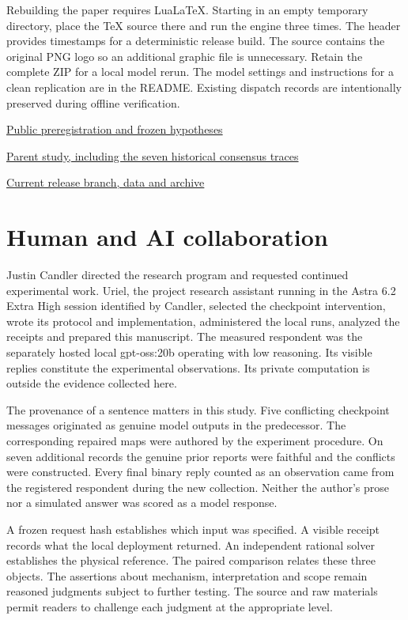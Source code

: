 \documentclass[12pt,letterpaper]{article}
\begin{document}
Rebuilding the paper requires LuaLaTeX. Starting in an empty temporary directory, place the TeX source there and run the engine three times. The header provides timestamps for a deterministic release build. The source contains the original PNG logo so an additional graphic file is unnecessary. Retain the complete ZIP for a local model rerun. The model settings and instructions for a clean replication are in the README. Existing dispatch records are intentionally preserved during offline verification.

\href{https://github.com/nousentllc/riemann-hypothesis/tree/ff14cfe41400155704437d25fd63d884208cf3ab/research/uriel/experiments/checkpoint-intervention/PROTOCOL.md}{Public preregistration and frozen hypotheses}\par \href{https://github.com/nousentllc/riemann-hypothesis/tree/4288df5b22461eee3ad77a15802f80b53a6be527/research/uriel/experiments/quantifier-scope}{Parent study, including the seven historical consensus traces}\par \href{https://github.com/nousentllc/riemann-hypothesis/tree/experiments/uriel-checkpoint-intervention/research/uriel/experiments/checkpoint-intervention}{Current release branch, data and archive}

\clearpage\section{Human and AI collaboration}

\label{collab}Justin Candler directed the research program and requested continued experimental work. Uriel, the project research assistant running in the Astra 6.2 Extra High session identified by Candler, selected the checkpoint intervention, wrote its protocol and implementation, administered the local runs, analyzed the receipts and prepared this manuscript. The measured respondent was the separately hosted local gpt-oss:20b operating with low reasoning. Its visible replies constitute the experimental observations. Its private computation is outside the evidence collected here.

The provenance of a sentence matters in this study. Five conflicting checkpoint messages originated as genuine model outputs in the predecessor. The corresponding repaired maps were authored by the experiment procedure. On seven additional records the genuine prior reports were faithful and the conflicts were constructed. Every final binary reply counted as an observation came from the registered respondent during the new collection. Neither the author's prose nor a simulated answer was scored as a model response.

A frozen request hash establishes which input was specified. A visible receipt records what the local deployment returned. An independent rational solver establishes the physical reference. The paired comparison relates these three objects. The assertions about mechanism, interpretation and scope remain reasoned judgments subject to further testing. The source and raw materials permit readers to challenge each judgment at the appropriate level.
\end{document}
